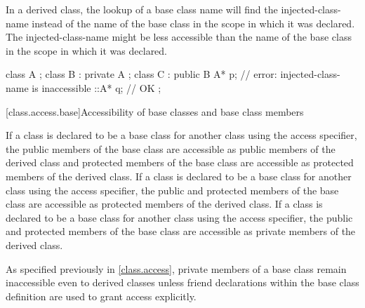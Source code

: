 \pnum
\begin{note}
In a derived class, the lookup of a base class name will find the
injected-class-name instead of the name of the base class in the scope
in which it was declared. The injected-class-name might be less accessible
than the name of the base class in the scope in which it was declared.
\end{note}

\begin{example}
\begin{codeblock}
class A { };
class B : private A { };
class C : public B {
  A* p;             // error: injected-class-name  is inaccessible
  ::A* q;           // OK
};
\end{codeblock}
\end{example}

[class.access.base]{Accessibility of base classes and base class members}%
%
%
%
%

\pnum
If a class is declared to be a base class for another class using the
access specifier, the
public members of the base class are accessible as
public members of the derived class and
protected members of the base class are accessible as
protected members of the derived class.
If a class is declared to be a base class for another class using the
access specifier, the
public and protected members of the base class are accessible as
protected members of the derived class.
If a class is declared to be a base class for another class using the
access specifier, the
public and protected
members of the base class are accessible as private
members of the derived class.
\begin{footnote}
As specified previously in \ref{class.access},
private members of a base class remain inaccessible even to derived classes
unless friend
declarations within the base class definition are used to grant access explicitly.
\end{footnote}

